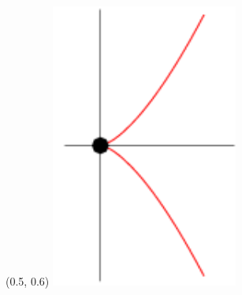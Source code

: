 \documentclass[UKenglish, unknownkeysallowed]{beamer}
\begin{document}
\begin{frame}
    {
        \begin{textblock}{0.15}(0.5, 0.6)
            \includegraphics[width = \textwidth]{cusp}
        \end{textblock}
    }


\end{frame}
\end{document}
